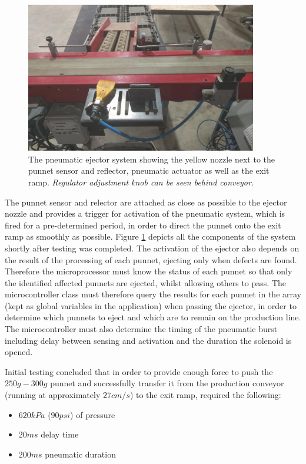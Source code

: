 \documentclass[fleqn,twoside,12pt]{report}
\begin{document}
\begin{figure}[h]
	\centering
	\includegraphics[width=0.9\textwidth]{ejector.jpg}
	\caption{The pneumatic ejector system showing the yellow nozzle next to the punnet sensor and reflector, pneumatic actuator as well as the exit ramp. \textit{Regulator adjustment knob can be seen behind conveyor.}}
	\label{fig:ejector}
\end{figure}

The punnet sensor and relector are attached as close as possible to the ejector nozzle and provides a trigger for activation of the pneumatic system, which is fired for a pre-determined period, in order to direct the punnet onto the exit ramp as smoothly as possible. Figure \ref{fig:ejector} depicts all the components of the system shortly after testing was completed. The activation of the ejector also depends on the result of the processing of each punnet, ejecting only when defects are found. Therefore the microprocessor must know the status of each punnet so that only the identified affected punnets are ejected, whilst allowing others to pass. The microcontroller class must therefore query the results for each punnet in the array (kept as global variables in the application) when passing the ejector, in order to determine which punnets to eject and which are to remain on the production line. The microcontroller must also determine the timing of the pneumatic burst including delay between sensing and activation and the duration the solenoid is opened. 

Initial testing concluded that in order to provide enough force to push the $250g-300g$ punnet and successfully transfer it from the production conveyor (running at approximately $27cm/s$) to the exit ramp, required the following:
\begin{itemize}
	\item $620kPa$ ($90psi$) of pressure
	\item $20ms$ delay time
	\item $200ms$ pneumatic duration
\end{itemize}
\end{document}
